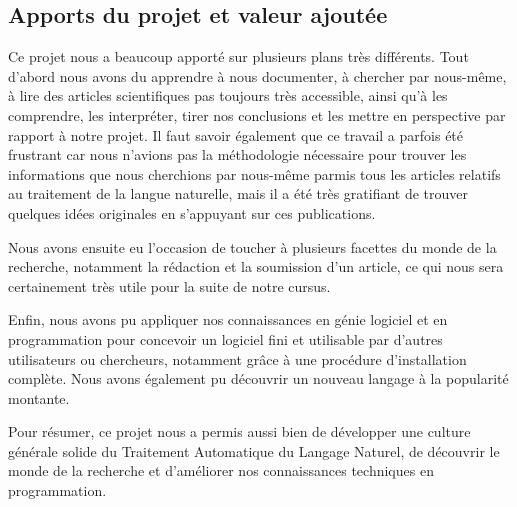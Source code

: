 \documentclass[10pt,a4paper]{article}
\begin{document}
\subsection{Apports du projet et valeur ajoutée}
\par Ce projet nous a beaucoup apporté sur plusieurs plans très différents. Tout d'abord nous avons du apprendre à nous documenter, à chercher par nous-même, à lire des articles scientifiques pas toujours très accessible, ainsi qu'à les comprendre, les interpréter, tirer nos conclusions et les mettre en perspective par rapport à notre projet. Il faut savoir également que ce travail a parfois été frustrant car nous n'avions pas la méthodologie nécessaire pour trouver les informations que nous cherchions par nous-même parmis tous les articles relatifs au traitement de la langue naturelle, mais il a été très gratifiant de trouver quelques idées originales en s'appuyant sur ces publications.
\par Nous avons ensuite eu l'occasion de toucher à plusieurs facettes du monde de la recherche, notamment la rédaction et la soumission d'un article, ce qui nous sera certainement très utile pour la suite de notre cursus. 
\par Enfin, nous avons pu appliquer nos connaissances en génie logiciel et en programmation pour concevoir un logiciel fini et utilisable par d'autres utilisateurs ou chercheurs, notamment grâce à une procédure d'installation complète. Nous avons également pu découvrir un nouveau langage à la popularité montante.
\par Pour résumer, ce projet nous a permis aussi bien de développer une culture générale solide du Traitement Automatique du Langage Naturel, de découvrir le monde de la recherche et d'améliorer nos connaissances techniques en programmation.

\end{document}
